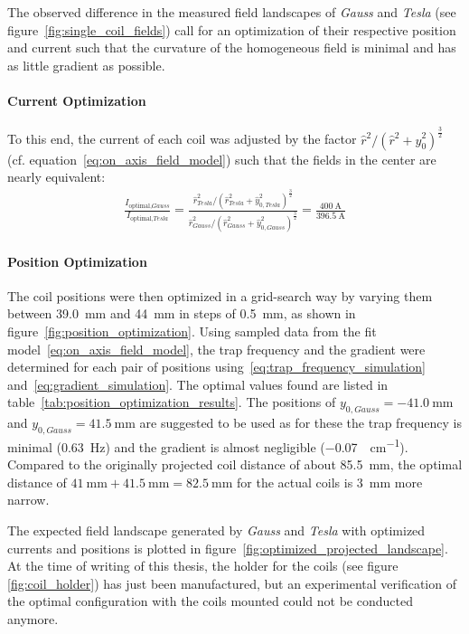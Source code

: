 The observed difference in the measured field landscapes of \textit{Gauss} and \textit{Tesla} (see figure~\ref{fig:single_coil_fields}) call for an optimization of their respective position and current such that the curvature of the homogeneous field is minimal and has as little gradient as possible.

\paragraph*{Current Optimization}
To this end, the current of each coil was adjusted by the factor ${\hat r^2}/{(\hat r^2 + \hat y_0^2)^\frac{3}{2}}$ (cf. equation~\ref{eq:on_axis_field_model}) such that the fields in the center are nearly equivalent:
\begin{align}
    \frac{I_{\text{optimal}, \textit{Gauss}}}{I_{\text{optimal}, \textit{Tesla}}} = \frac{\hat r_\textit{Tesla}^2 / (\hat r_\textit{Tesla}^2 + \hat y_{0, \textit{Tesla}}^2)^\frac{3}{2}}{\hat r_\textit{Gauss}^2 / (\hat r_\textit{Gauss}^2 + \hat y_{0, \textit{Gauss}}^2)^\frac{3}{2}} = \frac{\SI{400}{\ampere}}{\SI{396.5}{\ampere}}
\end{align}

\paragraph*{Position Optimization}
The coil positions were then optimized in a grid-search way by varying them between \SI{39.0}{\milli\meter} and \SI{44}{\milli\meter} in steps of \SI{0.5}{\milli\meter}, as shown in figure~\ref{fig:position_optimization}. Using sampled data from the fit model~\eqref{eq:on_axis_field_model}, the trap frequency and the gradient were determined for each pair of positions using~\eqref{eq:trap_frequency_simulation} and~\eqref{eq:gradient_simulation}.
The optimal values found are listed in table~\ref{tab:position_optimization_results}. The positions of $y_{0, \textit{Gauss}} = \SI{-41.0}{\milli\meter}$ and $y_{0, \textit{Gauss}} = \SI{41.5}{\milli\meter}$ are suggested to be used as for these the trap frequency is minimal (\SI{0.63}{\hertz}) and the gradient is almost negligible (\SI{-0.07}{\gauss\per\centi\meter}). Compared to the originally projected coil distance of about \SI{85.5}{\milli\meter}, the optimal distance of $\SI{41}{\milli\meter} + \SI{41.5}{\milli\meter} = \SI{82.5}{\milli\meter}$ for the actual coils is \SI{3}{\milli\meter} more narrow.

The expected field landscape generated by \textit{Gauss} and \textit{Tesla} with optimized currents and positions is plotted in figure~\ref{fig:optimized_projected_landscape}. At the time of writing of this thesis, the holder for the coils (see figure \ref{fig:coil_holder}) has just been manufactured, but an experimental verification of the optimal configuration with the coils mounted could not be conducted anymore.

